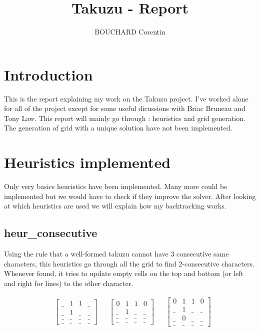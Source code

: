 \documentclass{article}
\title{Takuzu - Report}
\author{BOUCHARD Corentin}
\begin{document}
\maketitle


\section{Introduction}
This is the report explaining my work on the Takuzu project. I've worked alone for all of the project except for some useful dicussions with Briac Bruneau and Tony Law. This report will mainly go through : heuristics and grid generation. The generation of grid with a unique solution have not been implemented. 

\section{Heuristics implemented}
Only very basics heuristics have been implemented. Many more could be implemented but we would have to check if they improve the solver. After looking at which heuristics are used we will explain how my backtracking works. 
\subsection{heur\_consecutive}
Using the rule that a well-formed takuzu cannot have 3 consecutive same characters, this heuristics go through all the grid to find 2-consecutive characters. Whenever found, it tries to update empty cells on the top and bottom (or left and right for lines) to the other character.


\begin{align*}
    & \begin{bmatrix}
        \_ & 1 & 1 & \_ \\
        \_ & 1 & \_ & \_ \\
        \_ & \_ & \_ & \_ \\
        \_ & \_ & \_ & \_ 
    \end{bmatrix}
    && \begin{bmatrix}
        0 & 1 & 1 & 0 \\
        \_ & 1 & \_ & \_ \\
        \_ & \_ & \_ & \_ \\
        \_ & \_ & \_ & \_ 
    \end{bmatrix}
    && \begin{bmatrix}
        0 & 1 & 1 & 0 \\
        \_ & 1 & \_ & \_ \\
        \_ & 0 & \_ & \_ \\
        \_ & \_ & \_ & \_ 
    \end{bmatrix}
\end{align*}
\end{document}

